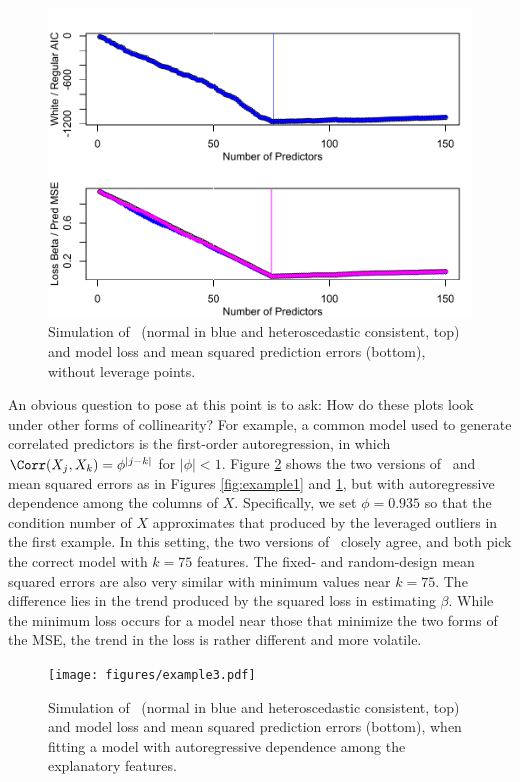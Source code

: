 \documentclass[12pt]{article}
\begin{document}
 \begin{figure}
 \caption{ Simulation of \aic\ (normal in blue and heteroscedastic consistent,
 top) and model loss and mean squared prediction errors (bottom), without
leverage points. }
 \label{fig:example2}
  \centerline{ \includegraphics[width=5in]{figures/example2.pdf} }
 \end{figure}



 An obvious question to pose at this point is to ask: How do these plots look
 under other forms of collinearity?  For example, a common model used to
 generate correlated predictors is the first-order autoregression, in which
 $\Corr(X_j,X_k) = \phi^{|j-k|}$ for $|\phi| < 1$.  Figure \ref{fig:example3}
 shows the two versions of \aic\ and mean squared errors as in Figures
 \ref{fig:example1} and \ref{fig:example2}, but with autoregressive dependence
 among the columns of $X$.  Specifically, we set $\phi=0.935$ so that the
 condition number of $X$ approximates that produced by the leveraged outliers in
 the first example.  In this setting, the two versions of \aic\ closely agree,
 and both pick the correct model with $k = 75$ features.  The fixed- and
 random-design mean squared errors are also very similar with minimum values
 near $k=75$.  The difference lies in the trend produced by the squared loss in
 estimating $\beta$.  While the minimum loss occurs for a model near those that
 minimize the two forms of the MSE, the trend in the loss is rather different
 and more volatile.

 \begin{figure}
 \caption{ Simulation of \aic\ (normal in blue and heteroscedastic consistent,
 top) and model loss and mean squared prediction errors (bottom), when fitting a
 model with autoregressive dependence among the explanatory features. }
 \label{fig:example3}
  \centerline{ \texttt{[image: figures/example3.pdf]} }
 \end{figure}
\end{document}
